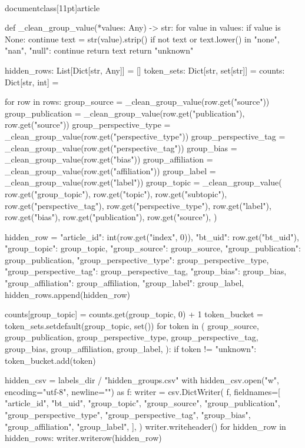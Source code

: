 \\documentclass[11pt]{article}
\begin{document}
\begin{CodeBlock}
    def _clean_group_value(*values: Any) -> str:
        for value in values:
            if value is None:
                continue
            text = str(value).strip()
            if not text or text.lower() in {"none", "nan", "null"}:
                continue
            return text
        return "unknown"

    hidden_rows: List[Dict[str, Any]] = []
    token_sets: Dict[str, set[str]] = {}
    counts: Dict[str, int] = {}

    for row in rows:
        group_source = _clean_group_value(row.get("source"))
        group_publication = _clean_group_value(row.get("publication"), row.get("source"))
        group_perspective_type = _clean_group_value(row.get("perspective_type"))
        group_perspective_tag = _clean_group_value(row.get("perspective_tag"))
        group_bias = _clean_group_value(row.get("bias"))
        group_affiliation = _clean_group_value(row.get("affiliation"))
        group_label = _clean_group_value(row.get("label"))
        group_topic = _clean_group_value(
            row.get("group_topic"),
            row.get("topic"),
            row.get("subtopic"),
            row.get("perspective_tag"),
            row.get("perspective_type"),
            row.get("label"),
            row.get("bias"),
            row.get("publication"),
            row.get("source"),
        )

        hidden_row = {
            "article_id": int(row.get("index", 0)),
            "bt_uid": row.get("bt_uid"),
            "group_topic": group_topic,
            "group_source": group_source,
            "group_publication": group_publication,
            "group_perspective_type": group_perspective_type,
            "group_perspective_tag": group_perspective_tag,
            "group_bias": group_bias,
            "group_affiliation": group_affiliation,
            "group_label": group_label,
        }
        hidden_rows.append(hidden_row)

        counts[group_topic] = counts.get(group_topic, 0) + 1
        token_bucket = token_sets.setdefault(group_topic, set())
        for token in (
            group_source,
            group_publication,
            group_perspective_type,
            group_perspective_tag,
            group_bias,
            group_affiliation,
            group_label,
        ):
            if token != "unknown":
                token_bucket.add(token)

    hidden_csv = labels_dir / "hidden_groups.csv"
    with hidden_csv.open("w", encoding="utf-8", newline="") as f:
        writer = csv.DictWriter(
            f,
            fieldnames=[
                "article_id",
                "bt_uid",
                "group_topic",
                "group_source",
                "group_publication",
                "group_perspective_type",
                "group_perspective_tag",
                "group_bias",
                "group_affiliation",
                "group_label",
            ],
        )
        writer.writeheader()
        for hidden_row in hidden_rows:
            writer.writerow(hidden_row)


\end{CodeBlock}
\end{document}
